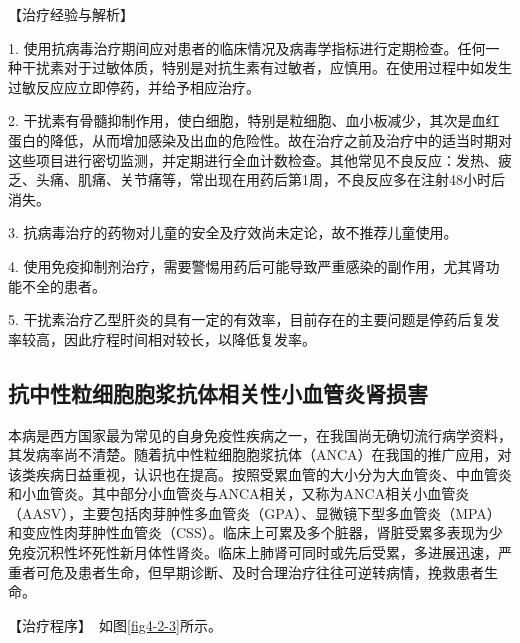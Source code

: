 【治疗经验与解析】

1.
使用抗病毒治疗期间应对患者的临床情况及病毒学指标进行定期检查。任何一种干扰素对于过敏体质，特别是对抗生素有过敏者，应慎用。在使用过程中如发生过敏反应应立即停药，并给予相应治疗。

2.
干扰素有骨髓抑制作用，使白细胞，特别是粒细胞、血小板减少，其次是血红蛋白的降低，从而增加感染及出血的危险性。故在治疗之前及治疗中的适当时期对这些项目进行密切监测，并定期进行全血计数检查。其他常见不良反应：发热、疲乏、头痛、肌痛、关节痛等，常出现在用药后第1周，不良反应多在注射48小时后消失。

3. 抗病毒治疗的药物对儿童的安全及疗效尚未定论，故不推荐儿童使用。

4.
使用免疫抑制剂治疗，需要警惕用药后可能导致严重感染的副作用，尤其肾功能不全的患者。

5.
干扰素治疗乙型肝炎的具有一定的有效率，目前存在的主要问题是停药后复发率较高，因此疗程时间相对较长，以降低复发率。

\subsection{抗中性粒细胞胞浆抗体相关性小血管炎肾损害}

本病是西方国家最为常见的自身免疫性疾病之一，在我国尚无确切流行病学资料，其发病率尚不清楚。随着抗中性粒细胞胞浆抗体（ANCA）在我国的推广应用，对该类疾病日益重视，认识也在提高。按照受累血管的大小分为大血管炎、中血管炎和小血管炎。其中部分小血管炎与ANCA相关，又称为ANCA相关小血管炎（AASV），主要包括肉芽肿性多血管炎（GPA）、显微镜下型多血管炎（MPA）和变应性肉芽肿性血管炎（CSS）。临床上可累及多个脏器，肾脏受累多表现为少免疫沉积性坏死性新月体性肾炎。临床上肺肾可同时或先后受累，多进展迅速，严重者可危及患者生命，但早期诊断、及时合理治疗往往可逆转病情，挽救患者生命。

【治疗程序】　如图\ref{fig4-2-3}所示。


